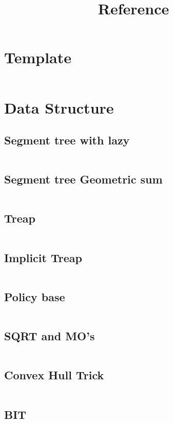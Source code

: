 \documentclass[10pt]{article}
\title{Reference}
\begin{document}
			\section{Template}
			\inputminted[tabsize=2,breaklines,fontsize=\small]{c++}{template.cpp}
			\section{Data Structure}
				\subsection{Segment tree with lazy}
					\inputminted[tabsize=2,breaklines,fontsize=\small]{c++}{DataStructures/SegmentTree.cpp}
				\subsection{Segment tree Geometric sum}	
					\inputminted[tabsize=2,breaklines,fontsize=\small]{c++}{DataStructures/ST-geometricSum.cpp}
				\subsection{Treap }	
					\inputminted[tabsize=2,breaklines,fontsize=\small]{c++}{DataStructures/treap.cpp}
				\subsection{Implicit Treap}
					\inputminted[tabsize=2,breaklines,fontsize=\small]{c++}{DataStructures/implicitTreap.cpp}
				\subsection{Policy base }	
					\inputminted[tabsize=2,breaklines,fontsize=\small]{c++}{DataStructures/policyBase.cpp}
				\subsection{SQRT and MO's}
					\inputminted[tabsize=2,breaklines,fontsize=\small]{c++}{DataStructures/sqrtDecom.cpp}
				\subsection{Convex Hull Trick}
					\inputminted[tabsize=2,breaklines,fontsize=\small]{c++}{DataStructures/ConvexHullTrick.cpp}
				\subsection{BIT}
					\inputminted[tabsize=2,breaklines,fontsize=\small]{c++}{DataStructures/BIT.cpp}
\end{document}
